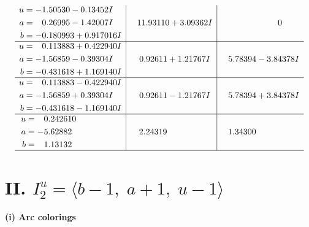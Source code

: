 \documentclass[1p]{elsarticle_modified}
\theoremstyle{definition}
\begin{document}
$$\begin{array}{c|c|c}
\begin{aligned}
u &= -1.50530 - 0.13452 I \\
a &= \phantom{-}0.26995 - 1.42007 I \\
b &= -0.180993 + 0.917016 I\end{aligned}
 & \phantom{-}11.93110 + 3.09362 I & \phantom{-0.000000 } 0 \\ \hline\begin{aligned}
u &= \phantom{-}0.113883 + 0.422940 I \\
a &= -1.56859 - 0.39304 I \\
b &= -0.431618 + 1.169140 I\end{aligned}
 & \phantom{-}0.92611 + 1.21767 I & \phantom{-}5.78394 - 3.84378 I \\ \hline\begin{aligned}
u &= \phantom{-}0.113883 - 0.422940 I \\
a &= -1.56859 + 0.39304 I \\
b &= -0.431618 - 1.169140 I\end{aligned}
 & \phantom{-}0.92611 - 1.21767 I & \phantom{-}5.78394 + 3.84378 I \\ \hline\begin{aligned}
u &= \phantom{-}0.242610\phantom{ +0.000000I} \\
a &= -5.62882\phantom{ +0.000000I} \\
b &= \phantom{-}1.13132\phantom{ +0.000000I}\end{aligned}
 & \phantom{-}2.24319\phantom{ +0.000000I} & \phantom{-}1.34300\phantom{ +0.000000I}\\
 \hline 
 \end{array}$$\newpage\newpage\renewcommand{\arraystretch}{1}
\centering \section*{II. $I^u_{2}= \langle b-1,\;a+1,\;u-1 \rangle$}
\flushleft \textbf{(i) Arc colorings}\\
\end{document}
